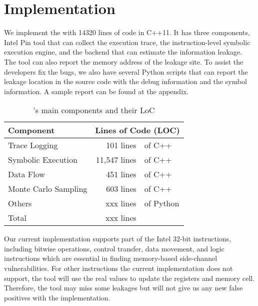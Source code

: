 \section{Implementation}
We implement the \tool{} with 14320 lines of code in C++11. 
It has three components, Intel
Pin tool that can collect the execution trace, 
the instruction-level symbolic execution
engine, and the backend that can estimate the information leakage. 
The tool can also report the memory address of the leakage site. 
To assist the developers fix the bugs,
we also have several Python scripts that can report the leakage 
location in the source code with the debug information and the symbol 
information. A sample report can be found at the appendix.

\begin{table}[h]
    \centering
    \begin{tabular}{lr@{~}@{}l}
    \hline
    Component                            & \multicolumn{2}{c}{Lines of Code (LOC)}    \\ \hline
    Trace Logging                        & 101 lines &of C++   \\ 
    Symbolic Execution & 11,547 lines &of C++ \\ 
    Data Flow & 451 lines &of C++                      \\
    Monte Carlo Sampling                 & 603 lines &of C++   \\ 
    Others                               & xxx lines &of Python    \\ \hline
    Total    & xxx lines & \\\hline
    \end{tabular}
    \caption{\tool{}'s main components and their LoC}
\end{table}

Our current implementation supports part of the Intel 32-bit instructions, 
including bitwise operations, control transfer, data movement, and logic 
instructions which are essential in finding memory-based side-channel 
vulnerabilities. For other 
instructions the current implementation does not support, 
the tool will use the real values to update the registers and memory cell.
Therefore, the tool may miss some leakages but will not give us any new
false positives with the implementation.
